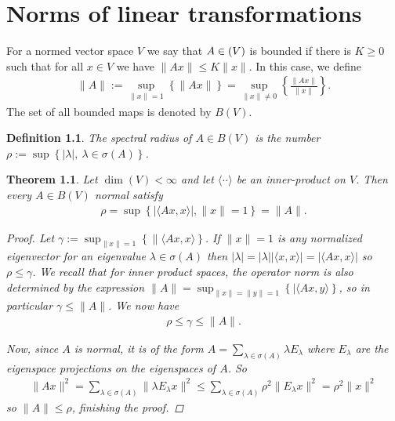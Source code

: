 \documentclass[10pt,twoside,openany,final]{memoir}
\theoremstyle{break}
\newtheorem{theorem}[section]{Theorem}
\newtheorem{definition}[section]{Definition}
\theoremstyle{Break}
\newcommand{\lv}{\lVert}
\newcommand{\rv}{\rVert}
\let\End\relax
\DeclareMathOperator{\End}{End}
\begin{document}
\chapter{Norms of linear transformations}
For a normed vector space $V$ we say that $A \in \End(V)$ is bounded if there is $K \geq 0$ such that for all $x \in V$ we have $\lv Ax \rv \leq K \lv x \rv$. In this case, we define
\begin{align*}
	\lv A \rv := \sup_{\lv x \rv = 1} \left\{ \lv Ax \rv \right\}= \sup_{\lv x \rv \neq 0} \left\{ \frac{\lv Ax \rv}{\lv x \rv} \right\}.
\end{align*}
The set of all bounded maps is denoted by $B(V)$.
\begin{definition}
	The spectral radius of $A \in B(V)$ is the number $\rho:=\sup\left\{ |\lambda | , \ \lambda \in \sigma(A) \right\}$.
\end{definition}

\begin{theorem}
	Let $\dim(V) < \infty$ and let $\langle \cdot  \cdot \rangle $ be an inner-product on $V$. Then every $A \in B(V)$ normal satisfy
	\begin{align*}
		\rho = \sup\left\{ | \langle Ax,x \rangle| , \lv x \rv = 1  \right\} = \lv A \rv.
	\end{align*}
\begin{proof}
	Let $\gamma:=\sup_{\lv x \rv = 1}\left\{ \lv \langle Ax,x\rangle \right\}$. If $\lv x \rv =1$ is any normalized eigenvector for an eigenvalue $\lambda \in \sigma(A)$ then $|\lambda|=|\lambda| | \langle x,x \rangle|= | \langle Ax ,x \rangle |  $ so $\rho \leq \gamma$. We recall that for inner product spaces, the operator norm is also determined by the expression $\lv A \rv=\sup_{\lv x \rv = \lv y \rv = 1} \left\{ |\langle Ax,y\rangle \right\}$, so in particular $\gamma \leq \lv A \rv$. We now have
	\begin{align*}
		\rho \leq \gamma \leq \lv A \rv.
	\end{align*}

	Now, since $A$ is normal, it is of the form $A=\sum_{\lambda \in \sigma(A)}\lambda E_\lambda$ where $E_\lambda$ are the eigenspace projections on the eigenspaces of $A$. So
	\begin{align*}
		\lv A x \rv^2 = \sum_{\lambda \in \sigma(A)} \lv \lambda E_\lambda x\rv ^2 \leq \sum_{\lambda \in \sigma(A)} \rho^2 \lv E_{\lambda} x \rv^2 = \rho^2 \lv x \rv^2
	\end{align*}
	so $\lv A \rv  \leq \rho$, finishing the proof.
\end{proof}
\end{theorem}
\end{document}
